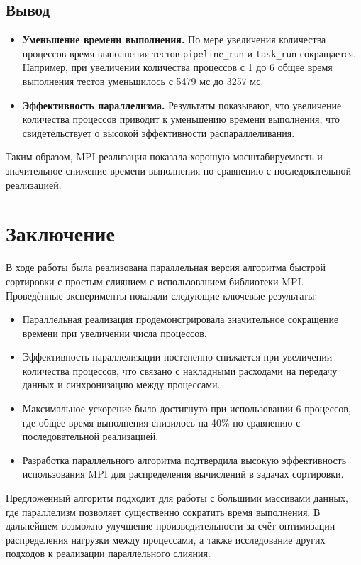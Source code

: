 \documentclass[12pt]{article}
\begin{document}
\subsection*{Вывод}
\begin{itemize}
    \item \textbf{Уменьшение времени выполнения.} По мере увеличения количества процессов время выполнения тестов \texttt{pipeline\_run} и \texttt{task\_run} сокращается. Например, при увеличении количества процессов с 1 до 6 общее время выполнения тестов уменьшилось с 5479 мс до 3257 мс.
    \item \textbf{Эффективность параллелизма.} Результаты показывают, что увеличение количества процессов приводит к уменьшению времени выполнения, что свидетельствует о высокой эффективности распараллеливания.
\end{itemize}

Таким образом, MPI-реализация показала хорошую масштабируемость и значительное снижение времени выполнения по сравнению с последовательной реализацией.

\section*{Заключение}

В ходе работы была реализована параллельная версия алгоритма быстрой сортировки с простым слиянием с использованием библиотеки MPI. 
Проведённые эксперименты показали следующие ключевые результаты:

\begin{itemize}
    \item Параллельная реализация продемонстрировала значительное сокращение времени при увеличении числа процессов.
    \item Эффективность параллелизации постепенно снижается при увеличении количества процессов, что связано с накладными расходами на передачу данных и синхронизацию между процессами.
    \item Максимальное ускорение было достигнуто при использовании 6 процессов, где общее время выполнения снизилось на 40\% по сравнению с последовательной реализацией.
    \item Разработка параллельного алгоритма подтвердила высокую эффективность использования MPI для распределения вычислений в задачах сортировки.
\end{itemize}

Предложенный алгоритм подходит для работы с большими массивами данных, где параллелизм позволяет существенно сократить время выполнения. 
В дальнейшем возможно улучшение производительности за счёт оптимизации распределения нагрузки между процессами, а также исследование других подходов к реализации параллельного слияния.
\end{document}

